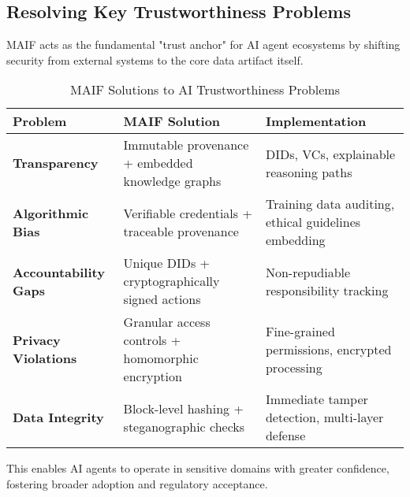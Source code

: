 \documentclass[conference]{IEEEtran}
\begin{document}
\subsection{Resolving Key Trustworthiness Problems}

MAIF acts as the fundamental "trust anchor" for AI agent ecosystems by shifting security from external systems to the core data artifact itself.

\begin{table*}[!t]
\renewcommand{\arraystretch}{1.3}
\caption{MAIF Solutions to AI Trustworthiness Problems}
\label{tab:trustworthiness-solutions}
\centering
\footnotesize
\begin{tabular}{p{3cm}p{5.5cm}p{5.5cm}}
\toprule
\textbf{Problem} & \textbf{MAIF Solution} & \textbf{Implementation} \\
\midrule
\textbf{Transparency} & Immutable provenance + embedded knowledge graphs & DIDs, VCs, explainable reasoning paths \\
\textbf{Algorithmic Bias} & Verifiable credentials + traceable provenance & Training data auditing, ethical guidelines embedding \\
\textbf{Accountability Gaps} & Unique DIDs + cryptographically signed actions & Non-repudiable responsibility tracking \\
\textbf{Privacy Violations} & Granular access controls + homomorphic encryption & Fine-grained permissions, encrypted processing \\
\textbf{Data Integrity} & Block-level hashing + steganographic checks & Immediate tamper detection, multi-layer defense \\
\bottomrule
\end{tabular}
\end{table*}

This enables AI agents to operate in sensitive domains with greater confidence, fostering broader adoption and regulatory acceptance.
\end{document}
